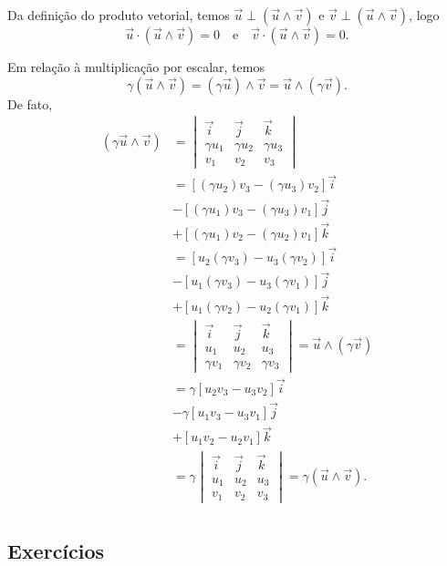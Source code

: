 Da definição do produto vetorial, temos $\vec{u}\perp(\vec{u}\land\vec{v})$ e $\vec{v}\perp(\vec{u}\land\vec{v})$, logo
\begin{equation}
  \vec{u}\cdot(\vec{u}\land\vec{v}) = 0\quad\text{e}\quad\vec{v}\cdot(\vec{u}\land\vec{v}) = 0.
\end{equation}

Em relação à multiplicação por escalar, temos
\begin{equation}
  \gamma(\vec{u}\land\vec{v}) = (\gamma\vec{u})\land\vec{v} = \vec{u}\land(\gamma\vec{v}).
\end{equation}
De fato,
\begin{align}
  (\gamma\vec{u}\land\vec{v}) &=
                                \begin{vmatrix}
                                  \vec{i} & \vec{j} & \vec{k} \\
                                  \gamma u_1 & \gamma u_2 & \gamma u_3\\
                                  v_1 & v_2 & v_3
                                \end{vmatrix} \\
                              &= [(\gamma u_2)v_3 - (\gamma u_3)v_2]\vec{i} \\
                              &- [(\gamma u_1)v_3 - (\gamma u_3)v_1]\vec{j} \\
                              &+ [(\gamma u_1)v_2 - (\gamma u_2)v_1]\vec{k} \\
                              &= [u_2(\gamma v_3) - u_3(\gamma v_2)]\vec{i} \\
                              &- [u_1(\gamma v_3) - u_3(\gamma v_1)]\vec{j} \\
                              &+ [u_1(\gamma v_2) - u_2(\gamma v_1)]\vec{k} \\
                              &=
                                \begin{vmatrix}
                                  \vec{i} & \vec{j} & \vec{k} \\
                                  u_1 & u_2 & u_3\\
                                  \gamma v_1 & \gamma v_2 & \gamma v_3
                                \end{vmatrix} = \vec{u}\land(\gamma\vec{v})\\
                              &= \gamma[u_2v_3 - u_3v_2]\vec{i} \\
                              &- \gamma[u_1v_3 - u_3v_1]\vec{j} \\
                              &+ [u_1v_2 - u_2v_1]\vec{k} \\
                              &= \gamma\begin{vmatrix}
                                  \vec{i} & \vec{j} & \vec{k} \\
                                  u_1 & u_2 & u_3\\
                                  v_1 & v_2 & v_3
                                \end{vmatrix} = \gamma(\vec{u}\land\vec{v}).\\
\end{align}

\emconstrucao

\subsection{Exercícios}

\emconstrucao
